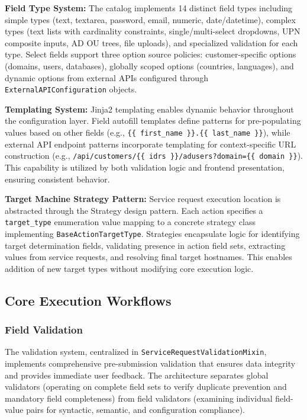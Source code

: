 \textbf{Field Type System:} The catalog implements 14 distinct field types including simple types (text, textarea, password, email, numeric, date/datetime), complex types (text lists with cardinality constraints, single/multi-select dropdowns, UPN composite inputs, AD OU trees, file uploads), and specialized validation for each type. Select fields support three option source policies: customer-specific options (domains, users, databases), globally scoped options (countries, languages), and dynamic options from external APIs configured through \texttt{ExternalAPIConfiguration} objects.

\textbf{Templating System:} Jinja2 templating enables dynamic behavior throughout the configuration layer. Field autofill templates define patterns for pre-populating values based on other fields (e.g., \texttt{\{\{ first\_name \}\}.\{\{ last\_name \}\}}), while external API endpoint patterns incorporate templating for context-specific URL construction (e.g., \texttt{/api/customers/\{\{ idrs \}\}/adusers?domain=\{\{ domain \}\}}). This capability is utilized by both validation logic and frontend presentation, ensuring consistent behavior.

\textbf{Target Machine Strategy Pattern:} Service request execution location is abstracted through the Strategy design pattern. Each action specifies a \texttt{target\_type} enumeration value mapping to a concrete strategy class implementing \texttt{BaseActionTargetType}. Strategies encapsulate logic for identifying target determination fields, validating presence in action field sets, extracting values from service requests, and resolving final target hostnames. This enables addition of new target types without modifying core execution logic.

\subsection{Core Execution Workflows}

\subsubsection{Field Validation}

The validation system, centralized in \texttt{ServiceRequestValidationMixin}, implements comprehensive pre-submission validation that ensures data integrity and provides immediate user feedback. The architecture separates global validators (operating on complete field sets to verify duplicate prevention and mandatory field completeness) from field validators (examining individual field-value pairs for syntactic, semantic, and configuration compliance).

